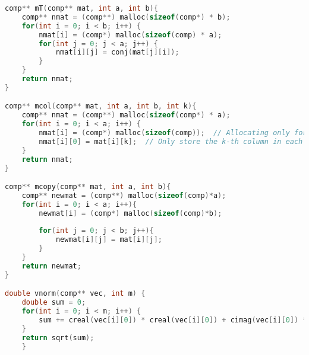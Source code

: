 \documentclass[journal,12pt,onecolumn]{IEEEtran}
\theoremstyle{remark}
\begin{document}
\begin{lstlisting}[language=C]
comp** mT(comp** mat, int a, int b){
	comp** nmat = (comp**) malloc(sizeof(comp*) * b);
	for(int i = 0; i < b; i++) {
		nmat[i] = (comp*) malloc(sizeof(comp) * a);
		for(int j = 0; j < a; j++) {
			nmat[i][j] = conj(mat[j][i]);
		}
	}
	return nmat;
}

comp** mcol(comp** mat, int a, int b, int k){
	comp** nmat = (comp**) malloc(sizeof(comp*) * a);
	for(int i = 0; i < a; i++) {
		nmat[i] = (comp*) malloc(sizeof(comp));  // Allocating only for one element per row
		nmat[i][0] = mat[i][k];  // Only store the k-th column in each row
	}
	return nmat;
}

comp** mcopy(comp** mat, int a, int b){
	comp** newmat = (comp**) malloc(sizeof(comp)*a);
	for(int i = 0; i < a; i++){
		newmat[i] = (comp*) malloc(sizeof(comp)*b);
		
		for(int j = 0; j < b; j++){
			newmat[i][j] = mat[i][j];
		}
	}
	return newmat;
}

double vnorm(comp** vec, int m) {
	double sum = 0;
	for(int i = 0; i < m; i++) {
		sum += creal(vec[i][0]) * creal(vec[i][0]) + cimag(vec[i][0]) * cimag(vec[i][0]);
	}
	return sqrt(sum);
	}	\end{lstlisting}
\end{document}
